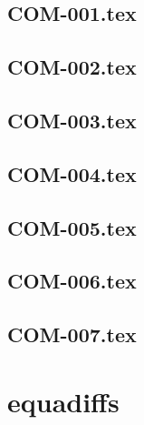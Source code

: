 \renewcommand{\xxexo}{COM-001.tex} 
\subsection*{\xxexo} 
\graphicspath{{../../exos/complexite/COM-001/}}
 
 
\renewcommand{\xxexo}{COM-002.tex} 
\subsection*{\xxexo} 
\graphicspath{{../../exos/complexite/COM-002/}}
 
 
\renewcommand{\xxexo}{COM-003.tex} 
\subsection*{\xxexo} 
\graphicspath{{../../exos/complexite/COM-003/}}
 
 
\renewcommand{\xxexo}{COM-004.tex} 
\subsection*{\xxexo} 
\graphicspath{{../../exos/complexite/COM-004/}}
 
 
\renewcommand{\xxexo}{COM-005.tex} 
\subsection*{\xxexo} 
\graphicspath{{../../exos/complexite/COM-005/}}
 
 
\renewcommand{\xxexo}{COM-006.tex} 
\subsection*{\xxexo} 
\graphicspath{{../../exos/complexite/COM-006/}}
 
 
\renewcommand{\xxexo}{COM-007.tex} 
\subsection*{\xxexo} 
\graphicspath{{../../exos/complexite/COM-007/}}
 
 
\section*{equadiffs}
\renewcommand{\xxexo}{EQD-000.tex} 
